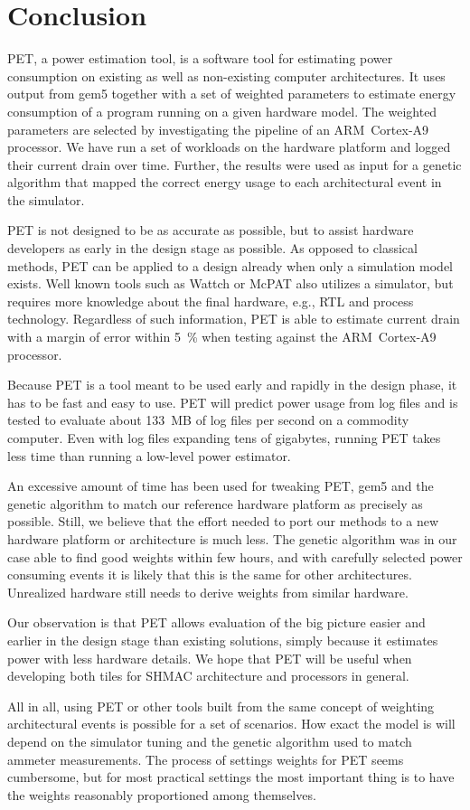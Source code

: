 \section{Conclusion}

PET, a power estimation tool, is a software tool for estimating power
consumption on existing as well as non-existing computer architectures. It uses
output from gem5 together with a set of weighted parameters to estimate energy
consumption of a program running on a given hardware model. The weighted
parameters are selected by investigating the pipeline of an ARM~Cortex-A9
processor. We have run a set of workloads on the hardware platform and logged
their current drain over time. Further, the results were used as input for a
genetic algorithm that mapped the correct energy usage to each architectural
event in the simulator.

PET is not designed to be as accurate as possible, but to assist hardware
developers as early in the design stage as possible. As opposed to classical
methods, PET can be applied to a design already when only a simulation model
exists. Well known tools such as Wattch \cite{brooks2000wattch} or McPAT
\cite{li2009mcpat,li2013mcpat} also utilizes a simulator, but requires more knowledge about
the final hardware, e.g., RTL and process technology. Regardless of such
information, PET is able to estimate current drain with a margin of error within
5~\% when testing against the ARM~Cortex-A9 processor.

Because PET is a tool meant to be used early and rapidly in the design phase, it
has to be fast and easy to use. PET will predict power usage from log files and
is tested to evaluate about 133~MB of log files per second on a commodity
computer. Even with log files expanding tens of gigabytes, running PET takes
less time than running a low-level power estimator.

An excessive amount of time has been used for tweaking PET, gem5 and the genetic
algorithm to match our reference hardware platform as precisely as possible. Still,
we believe that the effort needed to port our methods to a new hardware platform
or architecture is much less. The genetic algorithm was in our case able to find
good weights within few hours, and with carefully selected power consuming
events it is likely that this is the same for other architectures. Unrealized
hardware still needs to derive weights from similar hardware.

Our observation is that PET allows evaluation of the big picture easier and
earlier in the design stage than existing solutions, simply because it
estimates power with less hardware details. We hope that PET will be useful
when developing both tiles for SHMAC architecture and processors in general.

All in all, using PET or other tools built from the same concept of weighting
architectural events is possible for a set of scenarios. How exact the model is
will depend on the simulator tuning and the genetic algorithm used to match
ammeter measurements. The process of settings weights for PET seems cumbersome,
but for most practical settings the most important thing is to have the weights
reasonably proportioned among themselves.
